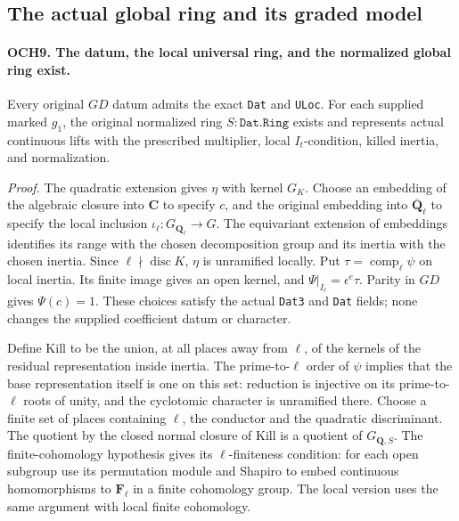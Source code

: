 \subsection{The actual global ring and its graded model}

\paragraph{OCH9. The datum, the local universal ring, and the normalized global ring exist.}
\label{claim:OCH9}
Every original \(GD\) datum admits the exact \texttt{Dat} and
\texttt{ULoc}.  For each supplied marked \(g_1\), the original
normalized ring \(S:\texttt{Dat.Ring}\) exists and represents
actual continuous lifts with the prescribed multiplier, local
\(I_t\)-condition, killed inertia, and normalization.

\emph{Proof.}
The quadratic extension gives \(\eta\) with kernel \(G_K\).
Choose an embedding of the algebraic closure into \(\mathbf C\)
to specify \(c\), and the original embedding into
\(\overline{\mathbf Q}_\ell\) to specify the local inclusion
\(\iota_\ell:G_{\mathbf Q_\ell}\to G\).  The equivariant
extension of embeddings identifies its range with the chosen
 decomposition group and its inertia with the chosen inertia.
Since \(\ell\nmid\operatorname{disc}K\), \(\eta\) is
unramified locally.  Put \(\tau=\operatorname{comp}_\ell\psi\)
on local inertia.  Its finite image gives an open kernel, and
\(\Psi|_{I_\ell}=\epsilon^e\tau\).  Parity in \(GD\)
gives \(\Psi(c)=1\).  These choices satisfy the actual
\texttt{Dat3} and \texttt{Dat} fields; none changes the supplied
coefficient datum or character.

Define \(\mathrm{Kill}\) to be the union, at all places away
from \(\ell\), of the kernels of the residual representation
inside inertia.  The prime-to-\(\ell\) order of \(\psi\)
implies that the base representation itself is one on this set:
reduction is injective on its prime-to-\(\ell\) roots of unity,
and the cyclotomic character is unramified there.  Choose a finite
set of places containing \(\ell\), the conductor and the
quadratic discriminant.  The quotient by the closed normal closure
of \(\mathrm{Kill}\) is a quotient of \(G_{\mathbf Q,S}\).
The finite-cohomology hypothesis gives its \(\ell\)-finiteness
condition: for each open subgroup use its permutation module and
Shapiro to embed continuous homomorphisms to \(\mathbf F_\ell\)
in a finite cohomology group.  The local version uses the same
argument with local finite cohomology.

